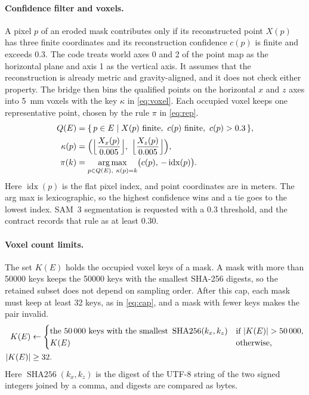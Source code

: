 \documentclass{article}
\begin{document}
\paragraph{Confidence filter and voxels.}
A pixel $p$ of an eroded mask contributes only if its reconstructed point $X(p)$ has three finite coordinates and its reconstruction confidence $c(p)$ is finite and exceeds 0.3. The code treats world axes 0 and 2 of the point map as the horizontal plane and axis 1 as the vertical axis. It assumes that the reconstruction is already metric and gravity-aligned, and it does not check either property. The bridge then bins the qualified points on the horizontal $x$ and $z$ axes into \SI{5}{\milli\metre} voxels with the key $\kappa$ in \cref{eq:voxel}. Each occupied voxel keeps one representative point, chosen by the rule $\pi$ in \cref{eq:rep}.
\begin{align}
  Q(E) &= \{\, p \in E \mid X(p) \text{ finite},\ c(p) \text{ finite},\ c(p) > 0.3 \,\}, \notag\\
  \kappa(p) &= \Bigl(\Bigl\lfloor \frac{X_x(p)}{0.005} \Bigr\rfloor,\ \Bigl\lfloor \frac{X_z(p)}{0.005} \Bigr\rfloor\Bigr), \label{eq:voxel}\\
  \pi(k) &= \operatorname*{arg\,max}_{p \in Q(E),\ \kappa(p) = k} \bigl(c(p),\, -\operatorname{idx}(p)\bigr). \label{eq:rep}
\end{align}
Here $\operatorname{idx}(p)$ is the flat pixel index, and point coordinates are in meters. The arg max is lexicographic, so the highest confidence wins and a tie goes to the lowest index. SAM~3 segmentation is requested with a 0.3 threshold, and the contract records that rule as at least 0.30.

\paragraph{Voxel count limits.}
The set $K(E)$ holds the occupied voxel keys of a mask. A mask with more than \num{50000} keys keeps the \num{50000} keys with the smallest SHA-256 digests, so the retained subset does not depend on sampling order. After this cap, each mask must keep at least 32 keys, as in \cref{eq:cap}, and a mask with fewer keys makes the pair invalid.
\begin{align}
  K(E) &\leftarrow
  \begin{cases}
    \text{the \num{50000} keys with the smallest } \operatorname{SHA256}(k_x, k_z) & \text{if } \lvert K(E) \rvert > \num{50000},\\
    K(E) & \text{otherwise,}
  \end{cases} \notag\\
  \lvert K(E) \rvert &\ge 32. \label{eq:cap}
\end{align}
Here $\operatorname{SHA256}(k_x, k_z)$ is the digest of the UTF-8 string of the two signed integers joined by a comma, and digests are compared as bytes.
\end{document}
